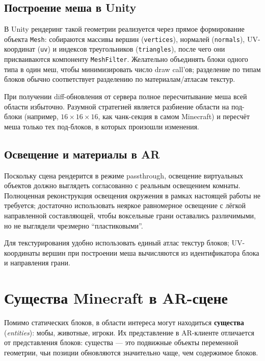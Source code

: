 \documentclass[a4paper,12pt]{article}
\begin{document}
\subsection*{Построение меша в Unity}

В Unity рендеринг такой геометрии реализуется через прямое формирование объекта \texttt{Mesh}: собираются массивы вершин (\texttt{vertices}), нормалей (\texttt{normals}), UV-координат (\texttt{uv}) и индексов треугольников (\texttt{triangles}), после чего они присваиваются компоненту \texttt{MeshFilter}. Желательно объединять блоки одного типа в один меш, чтобы минимизировать число draw call'ов; разделение по типам блоков обычно соответствует разделению по материалам/атласам текстур.

При получении diff-обновления от сервера полное пересчитывание меша всей области избыточно. Разумной стратегией является разбиение области на под-блоки (например, $16 \times 16 \times 16$, как чанк-секция в самом Minecraft) и пересчёт меша только тех под-блоков, в которых произошли изменения.

\subsection*{Освещение и материалы в AR}

Поскольку сцена рендерится в режиме passthrough, освещение виртуальных объектов должно выглядеть согласованно с реальным освещением комнаты. Полноценная реконструкция освещения окружения в рамках настоящей работы не требуется; достаточно использовать неяркое равномерное освещение с лёгкой направленной составляющей, чтобы воксельные грани оставались различимыми, но не выглядели чрезмерно ``пластиковыми''.

Для текстурирования удобно использовать единый атлас текстур блоков; UV-координаты вершин при построении меша вычисляются из идентификатора блока и направления грани.



\section*{Существа Minecraft в AR-сцене}

Помимо статических блоков, в области интереса могут находиться \textbf{существа} (\textit{entities}): мобы, животные, игроки. Их представление в AR-клиенте отличается от представления блоков: существа --- это подвижные объекты переменной геометрии, чьи позиции обновляются значительно чаще, чем содержимое блоков.
\end{document}

